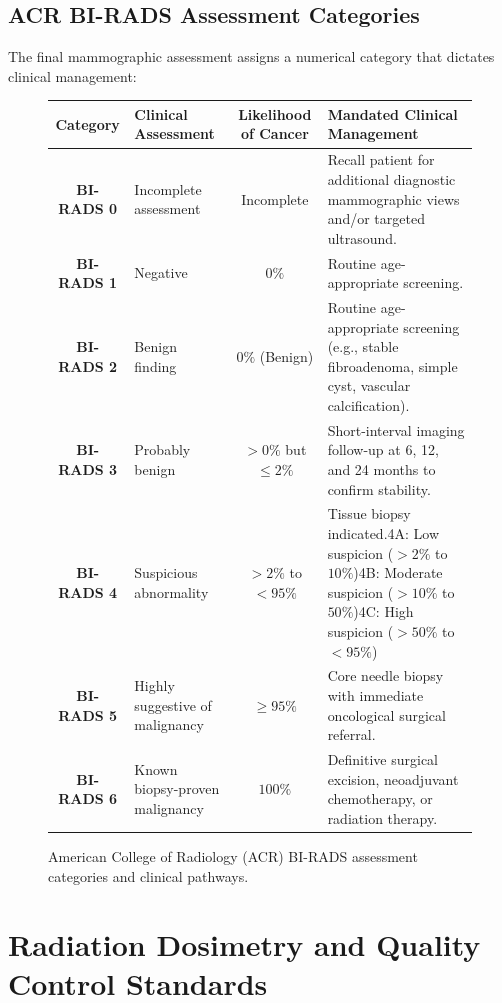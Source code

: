 \documentclass[11pt,a4paper]{article}
\begin{document}
\subsection{ACR BI-RADS Assessment Categories}

The final mammographic assessment assigns a numerical category that dictates clinical management:

\begin{figure}[htbp]
\centering
\setlength{\tabcolsep}{4pt}
\begin{tabular}{clcp{5.5cm}}
\toprule
\textbf{Category} & \textbf{Clinical Assessment} & \textbf{Likelihood of Cancer} & \textbf{Mandated Clinical Management} \\
\midrule
\textbf{BI-RADS 0} & Incomplete assessment & Incomplete & Recall patient for additional diagnostic mammographic views and/or targeted ultrasound. \\
\addlinespace
\textbf{BI-RADS 1} & Negative & $0\%$ & Routine age-appropriate screening. \\
\addlinespace
\textbf{BI-RADS 2} & Benign finding & $0\%$ (Benign) & Routine age-appropriate screening (e.g., stable fibroadenoma, simple cyst, vascular calcification). \\
\addlinespace
\textbf{BI-RADS 3} & Probably benign & $> 0\%$ but $\le 2\%$ & Short-interval imaging follow-up at 6, 12, and 24 months to confirm stability. \\
\addlinespace
\textbf{BI-RADS 4} & Suspicious abnormality & $> 2\%$ to $< 95\%$ & Tissue biopsy indicated.\newline 4A: Low suspicion ($> 2\%$ to $10\%$)\newline 4B: Moderate suspicion ($> 10\%$ to $50\%$)\newline 4C: High suspicion ($> 50\%$ to $< 95\%$) \\
\addlinespace
\textbf{BI-RADS 5} & Highly suggestive of malignancy & $\ge 95\%$ & Core needle biopsy with immediate oncological surgical referral. \\
\addlinespace
\textbf{BI-RADS 6} & Known biopsy-proven malignancy & $100\%$ & Definitive surgical excision, neoadjuvant chemotherapy, or radiation therapy. \\
\bottomrule
\end{tabular}
\caption{American College of Radiology (ACR) BI-RADS assessment categories and clinical pathways.}
\label{tab:birads_categories}
\end{figure}

\section{Radiation Dosimetry and Quality Control Standards}
\end{document}
